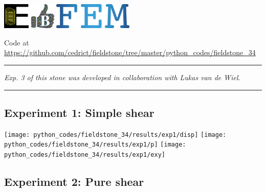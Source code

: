 \includegraphics[height=1.25cm]{images/pictograms/elasticity}
\includegraphics[height=1.25cm]{images/pictograms/benchmark}
\includegraphics[height=1.25cm]{images/pictograms/FEM}




\begin{center}
Code at \url{https://github.com/cedrict/fieldstone/tree/master/python_codes/fieldstone_34}
\end{center}

\par\noindent\rule{\textwidth}{0.4pt}

{\sl Exp. 3 of this stone was developed in collaboration with Lukas van de Wiel}.

\par\noindent\rule{\textwidth}{0.4pt}

\subsection*{Experiment 1: Simple shear}

\begin{center}
\texttt{[image: python\_codes/fieldstone\_34/results/exp1/disp]}
\texttt{[image: python\_codes/fieldstone\_34/results/exp1/p]}
\texttt{[image: python\_codes/fieldstone\_34/results/exp1/exy]}
\end{center}


\subsection*{Experiment 2: Pure shear }



